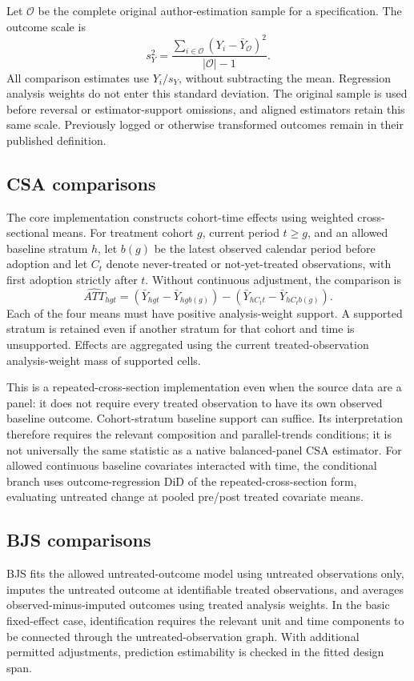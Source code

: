 \documentclass[11pt,letterpaper]{article}
\begin{document}
Let $\mathcal O$ be the complete original author-estimation sample for a specification. The outcome scale is
\begin{equation}
s_Y^2=\frac{\sum_{i\in\mathcal O}(Y_i-\bar Y_{\mathcal O})^2}{|\mathcal O|-1}.
\end{equation}
All comparison estimates use $Y_i/s_Y$, without subtracting the mean. Regression analysis weights do not enter this standard deviation. The original sample is used before reversal or estimator-support omissions, and aligned estimators retain this same scale. Previously logged or otherwise transformed outcomes remain in their published definition. 

\subsection{CSA comparisons}
The core implementation constructs cohort-time effects using weighted cross-sectional means. For treatment cohort $g$, current period $t\geq g$, and an allowed baseline stratum $h$, let $b(g)$ be the latest observed calendar period before adoption and let $C_t$ denote never-treated or not-yet-treated observations, with first adoption strictly after $t$. Without continuous adjustment, the comparison is
\begin{equation}
\widehat{ATT}_{hgt}=
  (\bar Y_{hgt}-\bar Y_{hg b(g)})
 -(\bar Y_{hC_t t}-\bar Y_{hC_t b(g)}).
\end{equation}
Each of the four means must have positive analysis-weight support. A supported stratum is retained even if another stratum for that cohort and time is unsupported. Effects are aggregated using the current treated-observation analysis-weight mass of supported cells.

This is a repeated-cross-section implementation even when the source data are a panel: it does not require every treated observation to have its own observed baseline outcome. Cohort-stratum baseline support can suffice. Its interpretation therefore requires the relevant composition and parallel-trends conditions; it is not universally the same statistic as a native balanced-panel CSA estimator. For allowed continuous baseline covariates interacted with time, the conditional branch uses outcome-regression DiD of the repeated-cross-section form, evaluating untreated change at pooled pre/post treated covariate means. 

\subsection{BJS comparisons}
BJS fits the allowed untreated-outcome model using untreated observations only, imputes the untreated outcome at identifiable treated observations, and averages observed-minus-imputed outcomes using treated analysis weights. In the basic fixed-effect case, identification requires the relevant unit and time components to be connected through the untreated-observation graph. With additional permitted adjustments, prediction estimability is checked in the fitted design span.
\end{document}
